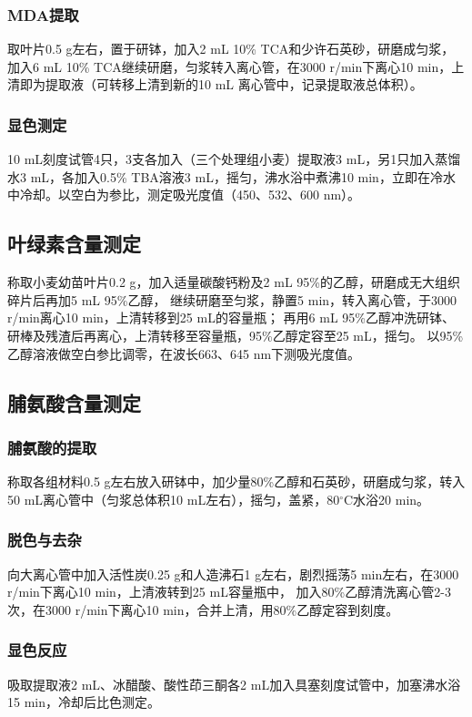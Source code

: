 \documentclass[UTF8]{ctexart}
\begin{document}
    \subsubsection*{MDA提取}
    取叶片0.5 g左右，置于研钵，加入2 mL 10\% TCA和少许石英砂，研磨成匀浆，加入6 mL 10\% TCA继续研磨，匀浆转入离心管，在3000 r/min下离心10 min，上清即为提取液（可转移上清到新的10 mL 离心管中，记录提取液总体积）。
    \subsubsection*{显色测定}
    10 mL刻度试管4只，3支各加入（三个处理组小麦）提取液3 mL，另1只加入蒸馏水3 mL，各加入0.5\% TBA溶液3 mL，摇匀，沸水浴中煮沸10 min，立即在冷水中冷却。以空白为参比，测定吸光度值（450、532、600 nm）。

    \subsection{叶绿素含量测定}
    称取小麦幼苗叶片0.2 g，加入适量碳酸钙粉及2 mL 95\%的乙醇，研磨成无大组织碎片后再加5 mL 95\%乙醇，
    继续研磨至匀浆，静置5 min，转入离心管，于3000 r/min离心10 min，上清转移到25 mL的容量瓶； 
    再用6 mL 95\%乙醇冲洗研钵、研棒及残渣后再离心，上清转移至容量瓶，95\%乙醇定容至25 mL，摇匀。
    以95\%乙醇溶液做空白参比调零，在波长663、645 nm下测吸光度值。


    \subsection{脯氨酸含量测定}
    \subsubsection*{脯氨酸的提取}
    称取各组材料0.5 g左右放入研钵中，加少量80\%乙醇和石英砂，研磨成匀浆，转入50 mL离心管中（匀浆总体积10 mL左右），摇匀，盖紧，80$^{\circ}$C水浴20 min。
    \subsubsection*{脱色与去杂}
    向大离心管中加入活性炭0.25 g和人造沸石1 g左右，剧烈摇荡5 min左右，在3000 r/min下离心10 min，上清液转到25 mL容量瓶中， 加入80\%乙醇清洗离心管2-3次，在3000 r/min下离心10 min，合并上清，用80\%乙醇定容到刻度。
    \subsubsection*{显色反应}
    吸取提取液2 mL、冰醋酸、酸性茚三酮各2 mL加入具塞刻度试管中，加塞沸水浴15 min，冷却后比色测定。
\end{document}
